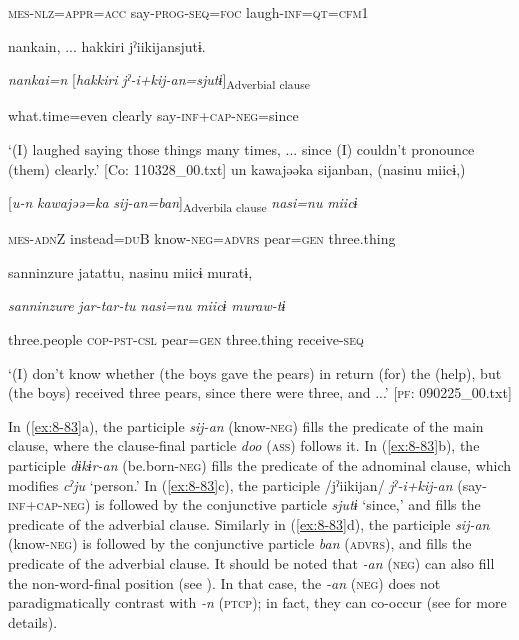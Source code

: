       \textsc{mes}-\textsc{nlz}=\textsc{appr}=\textsc{acc}  say-\textsc{prog}-\textsc{seq}=\textsc{foc}  laugh-\textsc{inf}=\textsc{qt}=\textsc{cfm1}

      {\textbar}nankai{\textbar}n, ...  {\textbar}hakkiri{\textbar}  jˀiikijansjutɨ.

      \textit{nankai=n}  [\textit{hakkiri}  \textit{jˀ-i+kij-an=sjutɨ}]\textsubscript{Adverbial clause}

      what.time=even  clearly  say-\textsc{inf}+\textsc{cap}-\textsc{neg}=since

\glt ‘(I) laughed saying those things many times, ... since (I) couldn’t pronounce (them) clearly.’ [Co: 110328\_00.txt]
\ex {\TM}
\glll  un  kawajəəka  sijanban,  (nasinu  miicɨ,)

      [\textit{u-n}  \textit{kawajəə=ka}  \textit{sij-an=ban}]\textsubscript{Adverbila clause}  \textit{nasi=nu}  \textit{miicɨ}

      \textsc{mes}-\textsc{adn}Z  instead=\textsc{du}B  know-\textsc{neg}=\textsc{advrs}  pear=\textsc{gen}  three.thing

      {\textbar}sanninzure{\textbar}  jatattu,  nasinu  miicɨ  muratɨ,

      \textit{sanninzure}  \textit{jar-tar-tu}  \textit{nasi=nu}  \textit{miicɨ}  \textit{muraw-tɨ}

      three.people  \textsc{cop}-\textsc{pst}-\textsc{csl}  pear=\textsc{gen}  three.thing  receive-\textsc{seq}

\glt ‘(I) don’t know whether (the boys gave the pears) in return (for) the (help), but (the boys) received three pears, since there were three, and ...’ [\textsc{pf}: 090225\_00.txt]
\z

In (\ref{ex:8-83}a), the participle \textit{sij-an} (know-\textsc{neg}) fills the predicate of the main clause, where the clause-final particle \textit{doo} (\textsc{ass}) follows it. In (\ref{ex:8-83}b), the participle \textit{dɨkɨr-an} (be.born-\textsc{neg}) fills the predicate of the adnominal clause, which modifies \textit{cˀju} ‘person.’ In (\ref{ex:8-83}c), the participle /jˀiikijan/ \textit{jˀ-i+kij-an} (say-\textsc{inf}+\textsc{cap}-\textsc{neg}) is followed by the conjunctive particle \textit{sjutɨ} ‘since,’ and fills the predicate of the adverbial clause. Similarly in (\ref{ex:8-83}d), the participle \textit{sij-an} (know-\textsc{neg}) is followed by the conjunctive particle \textit{ban} (\textsc{advrs}), and fills the predicate of the adverbial clause. It should be noted that \textit{{}-an} (\textsc{neg}) can also fill the non-word-final position (see ). In that case, the \textit{{}-an} (\textsc{neg}) does not paradigmatically contrast with \textit{{}-n} (\textsc{ptcp}); in fact, they can co-occur (see  for more details).

